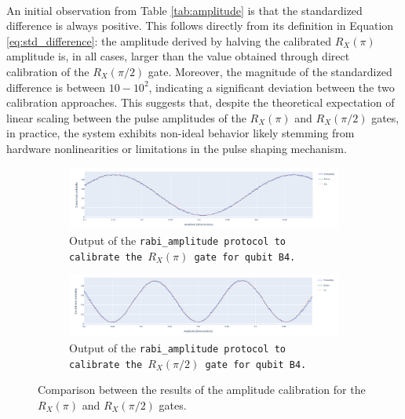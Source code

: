 \paragraph{}
An initial observation from Table \ref{tab:amplitude} is that the standardized difference is always positive. 
This follows directly from its definition in Equation \ref{eq:std_difference}: the amplitude derived by halving the calibrated $R_X(\pi)$ amplitude is, in all cases, larger than the value obtained through direct calibration of the $R_X(\pi/2)$ gate.
Moreover, the magnitude of the standardized difference is between $10-10^2$, indicating a significant deviation between the two calibration approaches. 
This suggests that, despite the theoretical expectation of linear scaling between the pulse amplitudes of the $R_X(\pi)$ and $R_X(\pi/2)$ gates, in practice, the system exhibits non-ideal behavior likely stemming from hardware nonlinearities or limitations in the pulse shaping mechanism.

\begin{figure}[h!]
    \centering
    \begin{subfigure}[t]{\textwidth}
        \includegraphics[width=\textwidth]{figures/png/RX90/RabiAmplitude/B4.png}
        \caption{Output of the \tt{rabi\_amplitude} protocol to calibrate the $R_X(\pi)$ gate for qubit \tt{B4}.}
        \label{fig:B4}
    \end{subfigure}
    \vspace{0.3cm}
    \begin{subfigure}[t]{\textwidth}
        \includegraphics[width=\textwidth]{figures/png/RX90/RabiAmplitude/B4_90.png}
        \caption{Output of the \tt{rabi\_amplitude} protocol to calibrate the $R_X(\pi/2)$ gate for qubit \tt{B4}.}
        \label{fig:B4_90}
    \end{subfigure}
    \caption{Comparison between the results of the amplitude calibration for the $R_X(\pi)$ and $R_X(\pi/2)$ gates.}
    \label{fig:amplitude_comparison}
\end{figure}

